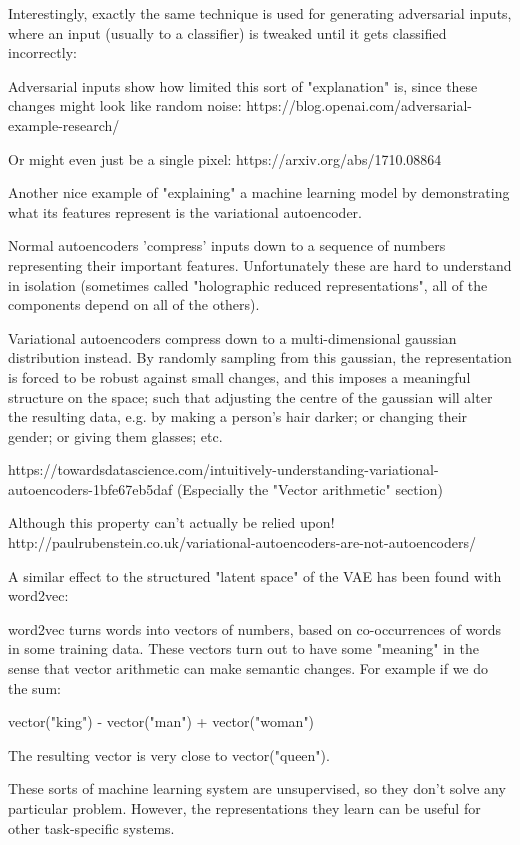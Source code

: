 \documentclass{article}
\begin{document}
Interestingly, exactly the same technique is used for generating
adversarial inputs, where an input (usually to a classifier) is tweaked
until it gets classified incorrectly:


Adversarial inputs show how limited this sort of "explanation" is, since
these changes might look like random noise:
https://blog.openai.com/adversarial-example-research/

Or might even just be a single pixel:
https://arxiv.org/abs/1710.08864

Another nice example of "explaining" a machine learning model by
demonstrating what its features represent is the variational
autoencoder.

Normal autoencoders 'compress' inputs down to a sequence of numbers
representing their important features. Unfortunately these are hard to
understand in isolation (sometimes called "holographic reduced
representations", all of the components depend on all of the others).

Variational autoencoders compress down to a multi-dimensional gaussian
distribution instead. By randomly sampling from this gaussian, the
representation is forced to be robust against small changes, and this
imposes a meaningful structure on the space; such that adjusting the
centre of the gaussian will alter the resulting data, e.g. by making a
person's hair darker; or changing their gender; or giving them glasses;
etc.

https://towardsdatascience.com/intuitively-understanding-variational-autoencoders-1bfe67eb5daf
(Especially the "Vector arithmetic" section)

Although this property can't actually be relied upon!
http://paulrubenstein.co.uk/variational-autoencoders-are-not-autoencoders/

A similar effect to the structured "latent space" of the VAE has been
found with word2vec:


word2vec turns words into vectors of numbers, based on co-occurrences of
words in some training data. These vectors turn out to have some
"meaning" in the sense that vector arithmetic can make semantic changes.
For example if we do the sum:

  vector("king") - vector("man") + vector("woman")

The resulting vector is very close to vector("queen").

These sorts of machine learning system are unsupervised, so they don't
solve any particular problem. However, the representations they learn
can be useful for other task-specific systems.



\end{document}
